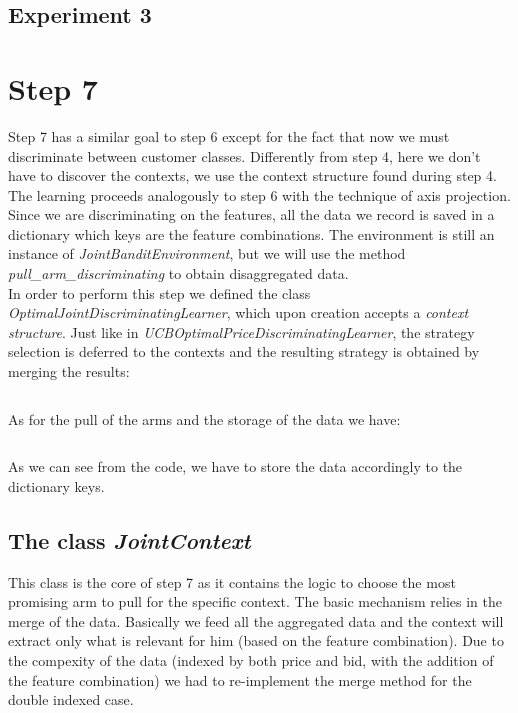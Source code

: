 \documentclass[11pt]{article} %
\begin{document}
\clearpage
{\footnotesize}

\clearpage
\subsection{Experiment 3}

\clearpage
{\footnotesize}

\clearpage
\section{Step 7}
Step 7 has a similar goal to step 6 except for the fact that now we must discriminate between customer classes. Differently from step 4, here we don't have to discover the contexts, we use the context structure found during step 4. The learning proceeds analogously to step 6 with the technique of axis projection.
Since we are discriminating on the features, all the data we record is saved in a dictionary which keys are the feature combinations.
The environment is still an instance of \textit{JointBanditEnvironment}, but we will use the method
\textit{pull\_arm\_discriminating} to obtain disaggregated data.\\

In order to perform this step we defined the class \textit{OptimalJointDiscriminatingLearner}, which upon creation accepts a \textit{context structure}. Just like in \textit{UCBOptimalPriceDiscriminatingLearner}, the strategy selection is deferred to the contexts and the resulting strategy is obtained by merging the results:
\inputminted{python}{code/step7_choose_strategy.py}
As for the pull of the arms and the storage of the data we have:
\inputminted{python}{code/step7_pull.py}
As we can see from the code, we have to store the data accordingly to the dictionary keys.

\subsection{The class \textit{JointContext}}
This class is the core of step 7 as it contains the logic to choose the most promising arm to pull for the specific
context.
The basic mechanism relies in the merge of the data. Basically we feed all the aggregated data and the context will
extract only what is relevant for him (based on the feature combination). Due to the compexity of the data (indexed by
both price and bid, with the addition of the feature combination) we had to re-implement the merge method for the
double indexed case.
\inputminted{python}{code/step7_merge.py}
\end{document}
